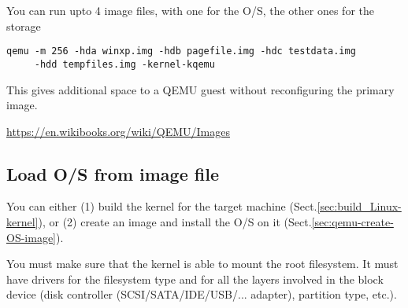 You can run upto 4 image files, with one for the O/S, the other ones for the
storage
\begin{verbatim}
qemu -m 256 -hda winxp.img -hdb pagefile.img -hdc testdata.img 
     -hdd tempfiles.img -kernel-kqemu
\end{verbatim}
This gives additional space to a QEMU guest without reconfiguring the primary
image.

\url{https://en.wikibooks.org/wiki/QEMU/Images}

\subsection{Load O/S from image file}
\label{sec:qemu-load-OS}

You can either (1) build the kernel for the target machine
(Sect.\ref{sec:build_Linux-kernel}), or (2) create an image and install the O/S
on it (Sect.\ref{sec:qemu-create-OS-image}).

You must make sure that the kernel is able to mount the root filesystem. It must
have drivers for the filesystem type and for all the layers involved in the
block device (disk controller (SCSI/SATA/IDE/USB/... adapter), partition type,
etc.).

